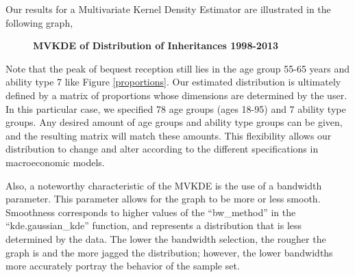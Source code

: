 \documentclass[letterpaper,12pt]{article}
\newcommand{\quotes}[1]{``#1''}
\theoremstyle{definition}
\begin{document}
\begin{spacing}{1.5}
    Our results for a Multivariate Kernel Density Estimator are illustrated in the following graph,\\

  \begin{figure}[htbp]\centering \captionsetup{width=6.0in}
    \caption{\label{MVKDE}\textbf{MVKDE of Distribution of Inheritances 1998-2013}}
  \end{figure}

\newpage
 Note that the peak of bequest reception still lies in the age group 55-65 years and ability type 7 like Figure \ref{proportions}. Our estimated distribution is ultimately defined by a matrix of proportions whose dimensions are determined by the user. In this particular case, we specified 78 age groups (ages 18-95) and 7 ability type groups. Any desired amount of age groups and ability type groups can be given, and the resulting matrix will match these amounts. This flexibility allows our distribution to change and alter according to the different specifications in macroeconomic models.

 Also, a noteworthy characteristic of the MVKDE is the use of a bandwidth parameter. This parameter allows for the graph to be more or less smooth. Smoothness corresponds to higher values of the \quotes{bw\_method} in the \quotes{kde.gaussian\_kde} function, and represents a distribution that is less determined by the data. The lower the bandwidth selection, the rougher the graph is and the more jagged the distribution; however, the lower bandwidths more accurately portray the behavior of the sample set. 




\end{spacing}
\end{document}
